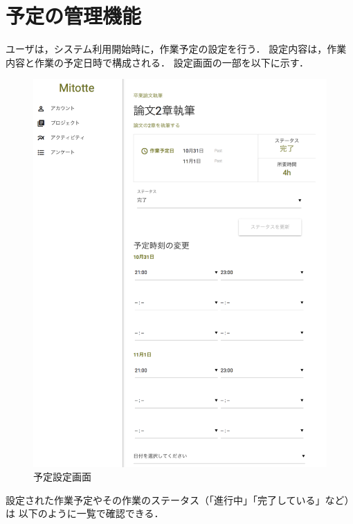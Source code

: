 \clearpage

\section{予定の管理機能}
ユーザは，システム利用開始時に，作業予定の設定を行う．
設定内容は，作業内容と作業の予定日時で構成される．
設定画面の一部を以下に示す．

\begin{figure}[h]
  \begin{center}
  \includegraphics[width=12.0cm]{graphics/mitotte01.png}
  \caption{予定設定画面}
  \end{center}
\end{figure}

\clearpage

設定された作業予定やその作業のステータス（「進行中」「完了している」など）は
以下のように一覧で確認できる．


